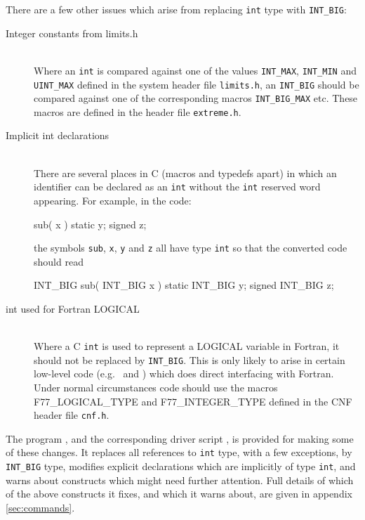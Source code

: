 \documentclass[twoside,11pt,nolof]{starlink}
\providecommand{\xroutine}[1]{\htmlref{\texttt{#1}}{#1}}
\providecommand{\xdofilter}[1]{\htmlref{\texttt{do-#1}}{do-xxx}}
\providecommand{\file}[1]{\texttt{#1}}
\providecommand{\cc}[1]{\texttt{#1}}
\providecommand{\ditem}[1]{\item[#1]\mbox{}\\}
\newenvironment{squote}{\begin{small}}{\end{small}}
\begin{document}
There are a few other issues which arise from replacing \cc{int} type
with \cc{INT\_BIG}:
\begin{description}
%
\ditem{Integer constants from limits.h}
Where an \cc{int} is compared against one of the values
\cc{INT\_MAX}, \cc{INT\_MIN} and \cc{UINT\_MAX}
defined in the system header file \file{limits.h},
an \cc{INT\_BIG} should be compared against one of the corresponding
macros \cc{INT\_BIG\_MAX} etc.
These macros are defined in the header file \file{extreme.h}.
%
\ditem{Implicit int declarations}
There are several places in C (macros and typedefs apart)
in which an identifier can be declared
as an \cc{int} without the \cc{int} reserved word appearing.
For example, in the code:
\begin{squote}
\begin{terminalv}
sub( x ) {
   static y;
   signed z;
}
\end{terminalv}
\end{squote}
the symbols \cc{sub}, \cc{x}, \cc{y} and \cc{z} all have type \cc{int}
so that the converted code should read
\begin{squote}
\begin{terminalv}
INT_BIG sub( INT_BIG x ) {
   static INT_BIG y;
   signed INT_BIG z;
}
\end{terminalv}
\end{squote}
%
\ditem{int used for Fortran LOGICAL}
Where a C \cc{int} is used to represent a LOGICAL variable in Fortran,
it should not be replaced by \cc{INT\_BIG}.
This is only likely to arise in certain low-level code
(e.g.\  and )
which does direct interfacing with Fortran.
Under normal circumstances code should use the macros
F77\_LOGICAL\_TYPE and F77\_INTEGER\_TYPE defined in the
CNF header file \file{cnf.h}.
%
\end{description}

The program \xroutine{crepint}, and the corresponding driver script
\xdofilter{crepint}, is provided for making some of these changes.
It replaces all references to \cc{int} type, with a few exceptions,
by \cc{INT\_BIG} type, modifies explicit declarations which are
implicitly of type \cc{int},
and warns about constructs which might need further attention.
Full details of which of the above constructs it fixes, and which it
warns about, are given in
appendix \ref{sec:commands}.
\end{document}
